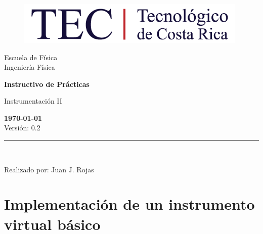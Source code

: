 \documentclass[12pt,letterpaper]{report}
\begin{document}
\begin{titlepage}

\begin{center}
\vspace*{1in}
\begin{figure}[htb]
\begin{center}
\includegraphics[width=11cm]{fig/comunes/logo.png}
\end{center}
\end{figure}
\vspace*{0.4in}
\begin{Huge}
Escuela de Física\\
\vspace*{0.15in}
Ingeniería Física\\
\vspace*{0.8in}
\end{Huge}
\vspace*{0.2in}
\begin{Large}
\textbf{Instructivo de Prácticas} \\
\end{Large}
\vspace*{0.3in}
\begin{large}
Instrumentación II\\
\end{large}
\vspace*{2.5in}
\begin{Large}
\textbf{\today}\\
Versión: 0.2\\
\end{Large}
\rule{80mm}{0.1mm}\\
\vspace*{0.1in}
\begin{large}
Realizado por: Juan J. Rojas\\
\end{large}
\end{center}

\end{titlepage}

\tableofcontents

\chapter{Implementación de un instrumento virtual básico}
\end{document}
